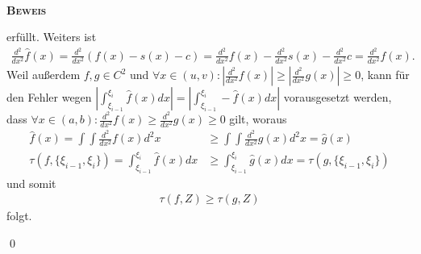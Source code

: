 \documentclass[12pt,a4paper]{scrartcl}
\numberwithin{equation}{section}
\numberwithin{myalgctr}{section}
\numberwithin{mytheoremctr}{subsection}
\numberwithin{mykorollarctr}{subsection}
\numberwithin{mylemmactr}{subsection}
\numberwithin{mybeispielctr}{subsection}
\newenvironment{myproof}{%
	\bigskip\noindent%
	\textsc{\textbf{\\Beweis\\}}%
	\indent
}{\qed\par\bigskip}  %
\begin{document}
\begin{myproof}
		erf\"ullt. Weiters ist
		\begin{align*}
		\frac{d^2}{dx^2}\hat{f}(x) = \frac{d^2}{dx^2} (f(x) - s(x) - c) = \frac{d^2}{dx^2}f(x) - \frac{d^2}{dx^2}s(x) - \frac{d^2}{dx^2}c= \frac{d^2}{dx^2}f(x).
		\end{align*}
		Weil au\ss erdem $f,g\in C^2$ und $\forall x \in (u,v):|\frac{d^2}{dx^2}f(x)| \geq |\frac{d^2}{dx^2}g(x)| \geq 0$, kann f\"ur den Fehler wegen $\left|\int_{\xi_{i-1}}^{\xi_i}\hat{f}(x)dx\right| = \left|\int_{\xi_{i-1}}^{\xi_i}-\hat{f}(x)dx\right|$ vorausgesetzt werden, dass $\forall x\in (a,b):\frac{d^2}{dx^2}f(x) \geq \frac{d^2}{dx^2}g(x) \geq 0$ gilt, woraus 
		\begin{align*}
		\hat{f}(x)  = \int\int \frac{d^2}{dx^2}f(x)d^2x &\geq \int\int \frac{d^2}{dx^2}g(x)d^2x = \hat{g}(x)\\
		\tau(f,\{\xi_{i-1},\xi_i\}) = \int_{\xi_{i-1}}^{\xi_{i}}\hat{f}(x)dx&\geq \int_{\xi_{i-1}}^{\xi_{i}}\hat{g}(x)dx = \tau(g,\{\xi_{i-1},\xi_i\})
		\end{align*}
		und somit
		\begin{align*}
		\tau(f,Z)\geq\tau(g,Z)
		\end{align*}
		folgt.
		
	\end{myproof}
\end{document}
